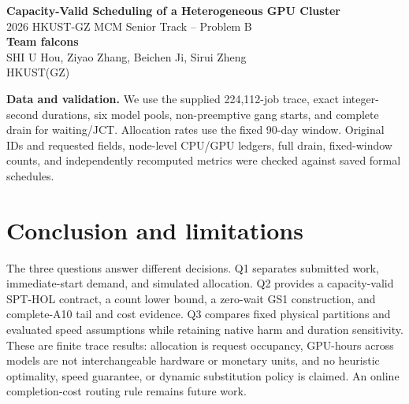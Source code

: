 


\begin{center}
{\Large\bfseries\color{primary} Capacity-Valid Scheduling of a Heterogeneous GPU Cluster}\\[3pt]
{\large 2026 HKUST-GZ MCM Senior Track -- Problem B}\\[5pt]
\textbf{Team falcons}\\[3pt]
SHI U Hou, Ziyao Zhang, Beichen Ji, Sirui Zheng\\[3pt]
HKUST(GZ)
\end{center}
\textbf{Data and validation.} We use the supplied 224,112-job trace, exact integer-second durations, six model pools, non-preemptive gang starts, and complete drain for waiting/JCT. Allocation rates use the fixed 90-day window. Original IDs and requested fields, node-level CPU/GPU ledgers, full drain, fixed-window counts, and independently recomputed metrics were checked against saved formal schedules.





\section{Conclusion and limitations}
The three questions answer different decisions. Q1 separates submitted work, immediate-start demand, and simulated allocation. Q2 provides a capacity-valid SPT-HOL contract, a count lower bound, a zero-wait GS1 construction, and complete-A10 tail and cost evidence. Q3 compares fixed physical partitions and evaluated speed assumptions while retaining native harm and duration sensitivity. These are finite trace results: allocation is request occupancy, GPU-hours across models are not interchangeable hardware or monetary units, and no heuristic optimality, speed guarantee, or dynamic substitution policy is claimed. An online completion-cost routing rule remains future work.

